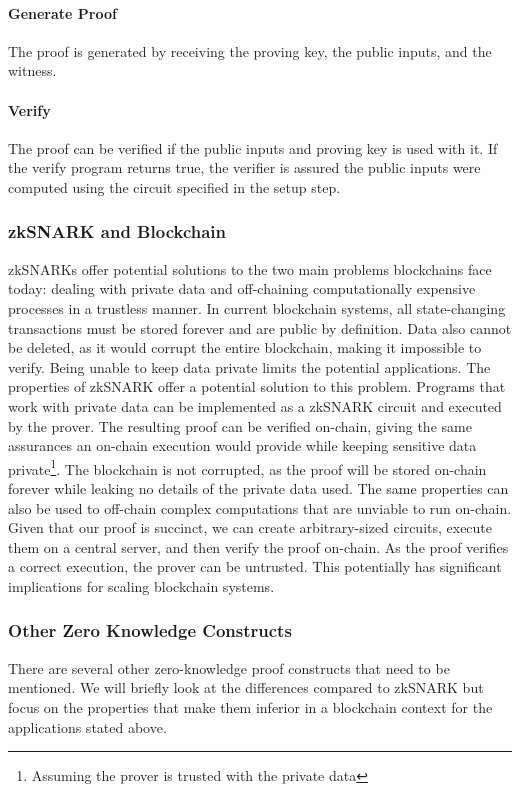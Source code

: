 \documentclass[../../thesis.tex]{subfiles}
\begin{document}
\paragraph{Generate Proof}
The proof is generated by receiving the proving key, the public inputs, and the witness. 

\paragraph{Verify}
The proof can be verified if the public inputs and proving key is used with it. If the verify program returns true, the verifier is assured the public inputs were computed using the circuit specified in the setup step. 

\subsubsection{zkSNARK and Blockchain}
zkSNARKs offer potential solutions to the two main problems blockchains face today: dealing with private data and off-chaining computationally expensive processes in a trustless manner. In current blockchain systems, all state-changing transactions must be stored forever and are public by definition. Data also cannot be deleted, as it would corrupt the entire blockchain, making it impossible to verify. Being unable to keep data private limits the potential applications. The properties of zkSNARK offer a potential solution to this problem. Programs that work with private data can be implemented as a zkSNARK circuit and executed by the prover. The resulting proof can be verified on-chain, giving the same assurances an on-chain execution would provide while keeping sensitive data private\footnote{Assuming the prover is trusted with the private data}. The blockchain is not corrupted, as the proof will be stored on-chain forever while leaking no details of the private data used. The same properties can also be used to off-chain complex computations that are unviable to run on-chain. Given that our proof is succinct, we can create arbitrary-sized circuits, execute them on a central server, and then verify the proof on-chain. As the proof verifies a correct execution, the prover can be untrusted. This potentially has significant implications for scaling blockchain systems. 

\subsubsection{Other Zero Knowledge Constructs}
There are several other zero-knowledge proof constructs that need to be mentioned. We will briefly look at the differences compared to zkSNARK but focus on the properties that make them inferior in a blockchain context for the applications stated above. 
\end{document}
